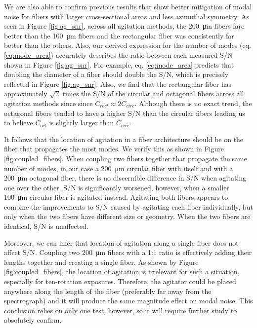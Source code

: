 \documentclass[twocolumn]{emulateapj}
\begin{document}
We are also able to confirm previous results that show better mitigation of modal noise for fibers with larger cross-sectional areas and less azimuthal symmetry. As seen in Figure \ref{fig:ag_snr}, across all agitation methods, the \SI{200}{\micro\meter} fibers fare better than the \SI{100}{\micro\meter} fibers and the rectangular fiber was consistently far better than the others. Also, our derived expression for the number of modes (eq. \ref{eq:mode_area}) accurately describes the ratio between each measured S/N shown in Figure \ref{fig:ag_snr}. For example, eq. \ref{eq:mode_area} predicts that doubling the diameter of a fiber should double the S/N, which is precisely reflected in Figure \ref{fig:ag_snr}. Also, we find that the rectangular fiber has approximately $\sqrt{2}$ times the S/N of the circular and octagonal fibers across all agitation methods since since $C_{rect} \approx 2C_{circ}$. Although there is no exact trend, the octagonal fibers tended to have a higher S/N than the circular fibers leading us to believe $C_{oct}$ is slightly larger than $C_{circ}$.

It follows that the location of agitation in a fiber architecture should be on the fiber that propagates the most modes. We verify this as shown in Figure \ref{fig:coupled_fibers}. When coupling two fibers together that propagate the same number of modes, in our case a \SI{200}{\micro\meter} circular fiber with itself and with a \SI{200}{\micro\meter} octagonal fiber, there is no discernible difference in S/N when agitating one over the other. S/N is significantly worsened, however, when a smaller \SI{100}{\micro\meter} circular fiber is agitated instead. Agitating both fibers appears to combine the improvements to S/N caused by agitating each fiber individually, but only when the two fibers have different size or geometry. When the two fibers are identical, S/N is unaffected.

Moreover, we can infer that location of agitation along a single fiber does not affect S/N. Coupling two \SI{200}{\micro\meter} fibers with a 1:1 ratio is effectively adding their lengths together and creating a single fiber. As shown by Figure \ref{fig:coupled_fibers}, the location of agitation is irrelevant for such a situation, especially for ten-rotation exposures. Therefore, the agitator could be placed anywhere along the length of the fiber (preferably far away from the spectrograph) and it will produce the same magnitude effect on modal noise. This conclusion relies on only one test, however, so it will require further study to absolutely confirm.
\end{document}
